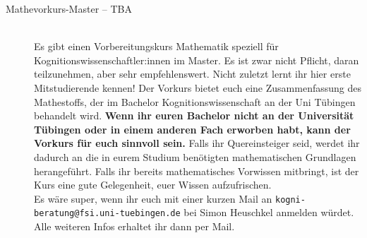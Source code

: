 \begin{description}


\ifkogwiss
    \ifmaster
        \item[Mathevorkurs-Master -- TBA]\ \\
        Es gibt einen Vorbereitungskurs Mathematik speziell für Kognitionswissenschaftler:innen im Master. 
        Es ist zwar nicht Pflicht, daran teilzunehmen, aber sehr empfehlenswert. Nicht zuletzt lernt ihr hier erste Mitstudierende kennen! Der Vorkurs bietet euch eine Zusammenfassung des Mathestoffs, der im Bachelor Kognitionswissenschaft an der Uni Tübingen behandelt wird.
        \textbf{Wenn ihr euren Bachelor nicht an der Universität Tübingen oder in einem anderen Fach erworben habt, kann der Vorkurs für euch sinnvoll sein.} Falls ihr Quereinsteiger seid, werdet ihr dadurch an die in eurem Studium benötigten mathematischen Grundlagen herangeführt. Falls ihr bereits mathematisches Vorwissen mitbringt, ist der Kurs eine gute Gelegenheit, euer Wissen aufzufrischen.\\
         Es wäre super, wenn ihr euch mit einer kurzen Mail an \texttt{kogni-beratung@fsi.uni-tuebingen.de} bei Simon Heuschkel anmelden würdet. Alle weiteren Infos erhaltet ihr dann per Mail.
    \fi
\fi


\end{description}
